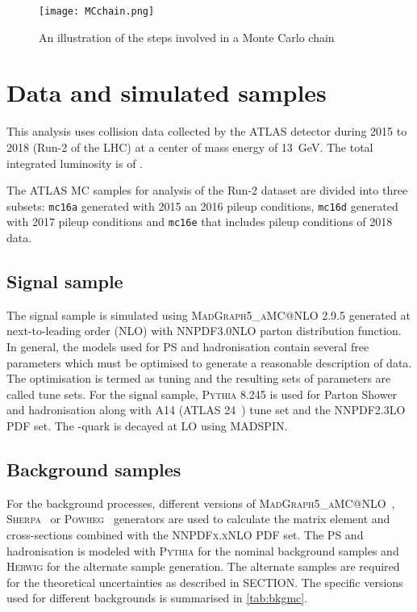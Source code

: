 \begin{figure}
  \centering
      \texttt{[image: MCchain.png]}
      \caption{An illustration of the steps involved in a Monte Carlo chain~\cite{Plehn:2022ftl}}
         \label{fig:MCchain}
\end{figure}

\section{Data and simulated samples}
This analysis uses collision data collected by the ATLAS detector during 2015 to 2018 (Run-2 of the LHC) at a center of
mass energy of \qty{13}{\GeV}. The total integrated luminosity is of \lumi.

The ATLAS MC samples for analysis of the Run-2 dataset are divided into three subsets: 
\texttt{mc16a} generated with 2015 an 2016 pileup conditions, \texttt{mc16d} generated with 
2017 pileup conditions and \texttt{mc16e} that includes pileup conditions of 2018 data. 

\subsection{Signal sample}
The \tZq signal sample is simulated using \textsc{MadGraph5\_aMC@NLO} 2.9.5 generated at next-to-leading
order (NLO) with \textsc{NNPDF3.0NLO} parton distribution function. In general, the models used for
PS and hadronisation contain several free parameters which must be optimised to generate a reasonable
description of data. The optimisation is termed as tuning and the resulting sets of parameters are called
tune sets. For the signal sample, \textsc{Pythia} 8.245 is used for Parton Shower and
hadronisation along with A14 (ATLAS 24~\cite{ATL-PHYS-PUB-2014-021}) tune set and the \textsc{NNPDF2.3LO} PDF set.
The \Ptop-quark is decayed at LO using \textsc{MADSPIN}.

\subsection{Background samples}
For the background processes, different versions of \textsc{MadGraph5\_aMC@NLO}~\cite{Alwall:2014hca}, 
\textsc{Sherpa}~\cite{Gleisberg:2008ta} or \textsc{Powheg}~\cite{Banfi:2023mhz} generators are used to
calculate the matrix element and cross-sections combined with the \textsc{NNPDFx.xNLO} PDF set.
The PS and hadronisation is modeled with \textsc{Pythia} for the nominal background samples
and \textsc{Herwig} for the alternate sample generation. The alternate samples are required
for the theoretical uncertainties as described in SECTION. The specific versions
used for different backgrounds is summarised in \cref{tab:bkgmc}.

